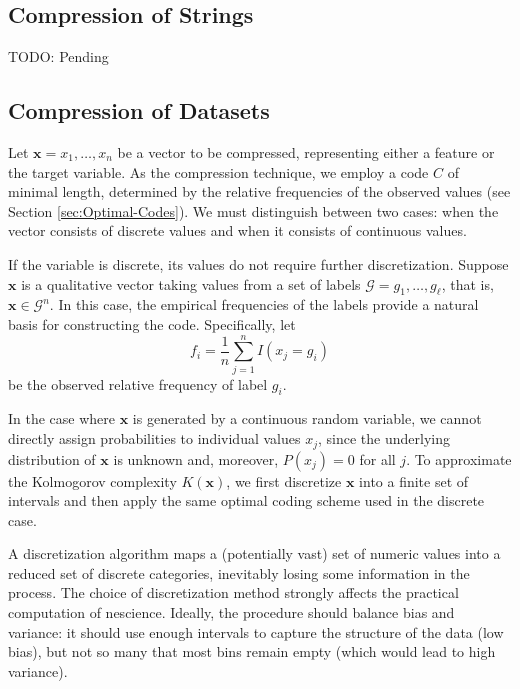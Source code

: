 
\subsection{Compression of Strings} 

{\color{red} TODO: Pending}


\subsection{Compression of Datasets}

Let $\mathbf{x} = { x_1, \ldots, x_n }$ be a vector to be compressed, representing either a feature or the target variable. As the compression technique, we employ a code $C$ of minimal length, determined by the relative frequencies of the observed values (see Section \ref{sec:Optimal-Codes}). We must distinguish between two cases: when the vector consists of discrete values and when it consists of continuous values.

If the variable is discrete, its values do not require further discretization. Suppose $\mathbf{x}$ is a qualitative vector taking values from a set of labels $\mathcal{G} = {g_1, \ldots, g_\ell}$, that is, $\mathbf{x} \in \mathcal{G}^n$. In this case, the empirical frequencies of the labels provide a natural basis for constructing the code. Specifically, let
\[
f_i = \frac{1}{n}\sum_{j=1}^n I(x_j = g_i)
\]
be the observed relative frequency of label $g_i$.

In the case where $\mathbf{x}$ is generated by a continuous random variable, we cannot directly assign probabilities to individual values $x_j$, since the underlying distribution of $\mathbf{x}$ is unknown and, moreover, $P(x_j)=0$ for all $j$. To approximate the Kolmogorov complexity $K(\mathbf{x})$, we first discretize $\mathbf{x}$ into a finite set of intervals and then apply the same optimal coding scheme used in the discrete case.

A discretization algorithm maps a (potentially vast) set of numeric values into a reduced set of discrete categories, inevitably losing some information in the process. The choice of discretization method strongly affects the practical computation of nescience. Ideally, the procedure should balance bias and variance: it should use enough intervals to capture the structure of the data (low bias), but not so many that most bins remain empty (which would lead to high variance).

